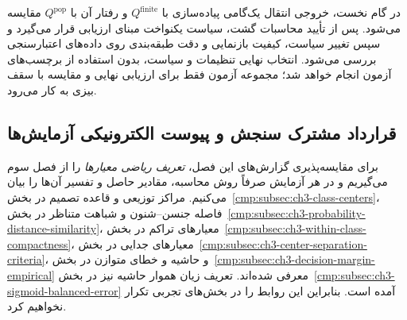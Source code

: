 در گام نخست، خروجی انتقال یک‌گامی پیاده‌سازی با $Q^{\mathrm{finite}}$ و رفتار آن با $Q^{\mathrm{pop}}$ مقایسه می‌شود. پس از تأیید محاسبات گشت، سیاست یکنواخت مبنای ارزیابی قرار می‌گیرد و سپس تغییر سیاست، کیفیت بازنمایی و دقت طبقه‌بندی روی داده‌های اعتبارسنجی بررسی می‌شود. انتخاب نهایی تنظیمات و سیاست، بدون استفاده از برچسب‌های آزمون انجام خواهد شد؛ مجموعه آزمون فقط برای ارزیابی نهایی و مقایسه با سقف بیزی به کار می‌رود.


\subsection{قرارداد مشترک سنجش و پیوست الکترونیکی آزمایش‌ها}
\label{subsec:ch4-common-evaluation-contract}
برای مقایسه‌پذیری گزارش‌های این فصل،
\emph{تعریف ریاضی معیارها} را از فصل سوم
می‌گیریم و در هر آزمایش صرفاً روش محاسبه،
مقادیر حاصل و تفسیر آن‌ها را بیان می‌کنیم.
مراکز توزیعی و قاعده تصمیم در
بخش~\ref{cmp:subsec:ch3-class-centers}،
فاصله جنسن--شنون و شباهت متناظر در
بخش~\ref{cmp:subsec:ch3-probability-distance-similarity}،
معیارهای تراکم در
بخش~\ref{cmp:subsec:ch3-within-class-compactness}،
معیارهای جدایی در
بخش~\ref{cmp:subsec:ch3-center-separation-criteria}،
و حاشیه و خطای متوازن در
بخش~\ref{cmp:subsec:ch3-decision-margin-empirical}
معرفی شده‌اند. تعریف زیان هموار حاشیه
نیز در بخش~\ref{cmp:subsec:ch3-sigmoid-balanced-error}
آمده است. بنابراین این روابط را در
بخش‌های تجربی تکرار نخواهیم کرد.

